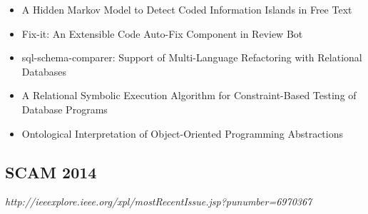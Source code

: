 {\begin{itemize}[itemsep=-1ex]
  \item A Hidden Markov Model to Detect Coded Information Islands in Free Text {\color{blue} \checkmark}{\color{red} \texttimes}
  \item Fix-it: An Extensible Code Auto-Fix Component in Review Bot {\color{blue} \checkmark}{\color{red} \texttimes}
  \item sql-schema-comparer: Support of Multi-Language Refactoring with Relational Databases
  \item A Relational Symbolic Execution Algorithm for Constraint-Based Testing of Database Programs
  \item Ontological Interpretation of Object-Oriented Programming Abstractions
\end{itemize}
}

\subsection{SCAM 2014}

{\small \em http://ieeexplore.ieee.org/xpl/mostRecentIssue.jsp?punumber=6970367}


